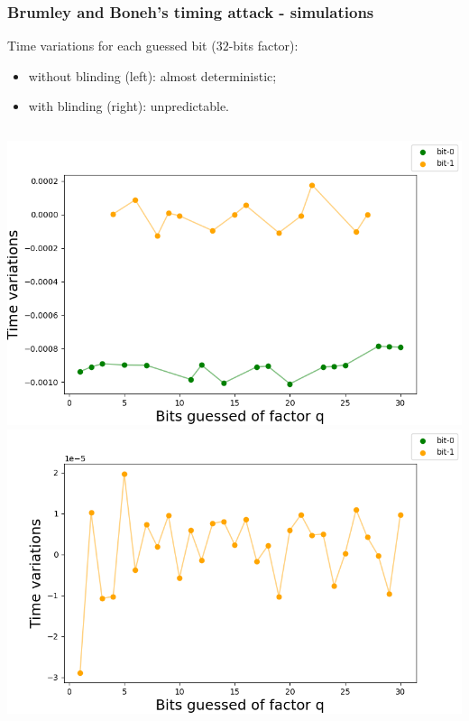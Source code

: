 \documentclass{beamer}
\begin{document}
\begin{frame}
\frametitle{Brumley and Boneh's timing attack - simulations}

Time variations for each guessed bit ($32$-bits factor):
\begin{itemize}
  \item without blinding (left): almost deterministic;
  \item with blinding (right): unpredictable.
\end{itemize}

\begin{columns}[t]
    \centering
    \includegraphics[width=1.0\textwidth]{figures/backup-attack_without_blinding}
    \centering
    \includegraphics[width=1.0\textwidth]{figures/backup-attack_with_blinding}
\end{columns}

\end{frame}
\end{document}
